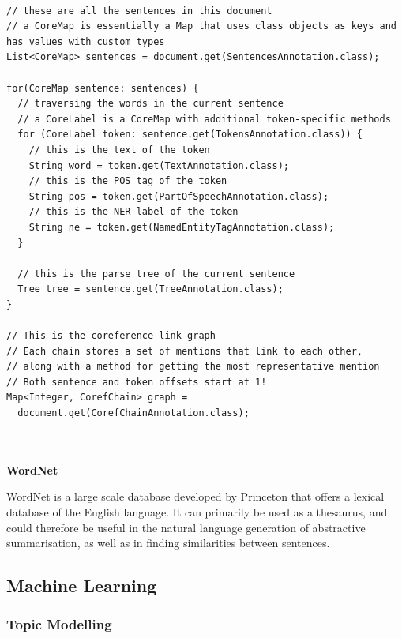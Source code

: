 \documentclass[12pt]{article}
\begin{document}
\begin{lstlisting}[style=MyJava, firstnumber=1, caption={Analysing an annotated document using Stanford's CoreNLP},captionpos=b]

// these are all the sentences in this document
// a CoreMap is essentially a Map that uses class objects as keys and has values with custom types
List<CoreMap> sentences = document.get(SentencesAnnotation.class);

for(CoreMap sentence: sentences) {
  // traversing the words in the current sentence
  // a CoreLabel is a CoreMap with additional token-specific methods
  for (CoreLabel token: sentence.get(TokensAnnotation.class)) {
    // this is the text of the token
    String word = token.get(TextAnnotation.class);
    // this is the POS tag of the token
    String pos = token.get(PartOfSpeechAnnotation.class);
    // this is the NER label of the token
    String ne = token.get(NamedEntityTagAnnotation.class);
  }

  // this is the parse tree of the current sentence
  Tree tree = sentence.get(TreeAnnotation.class);
}

// This is the coreference link graph
// Each chain stores a set of mentions that link to each other,
// along with a method for getting the most representative mention
// Both sentence and token offsets start at 1!
Map<Integer, CorefChain> graph = 
  document.get(CorefChainAnnotation.class); 
 
\end{lstlisting}

\textbf{\\ WordNet}

\label{WordNet}

WordNet is a large scale database developed by Princeton that offers a lexical database of the English language. It can primarily be used as a thesaurus, and could therefore be useful in the natural language generation of abstractive summarisation, as well as in finding similarities between sentences.

\subsection{Machine Learning}

\label{machinelearning}

\subsubsection{Topic Modelling}
\end{document}
